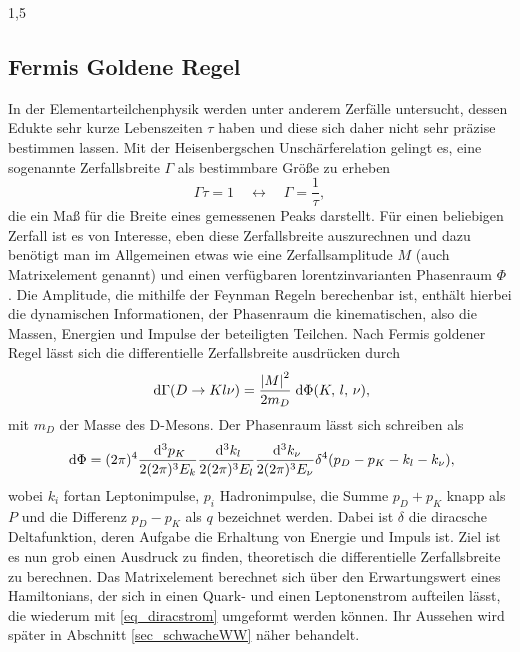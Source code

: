 \documentclass[11pt,a4paper,twoside]{report}
\begin{document}
\begin{spacing}{1,5}
\subsection{Fermis Goldene Regel}
\label{sec_fermi}
In der Elementarteilchenphysik werden unter anderem Zerfälle untersucht, dessen Edukte sehr kurze Lebenszeiten $\tau$ haben und diese sich daher nicht sehr präzise
bestimmen lassen. Mit der Heisenbergschen Unschärferelation gelingt es, eine sogenannte Zerfallsbreite $\Gamma$ als bestimmbare Größe zu erheben
\begin{equation}
 \Gamma \tau = 1 \quad \leftrightarrow\quad  \Gamma = \frac{1}{\tau},
\end{equation} 
die ein Maß für die Breite eines gemessenen Peaks darstellt. Für einen beliebigen Zerfall ist es von Interesse, eben diese Zerfallsbreite auszurechnen und dazu
benötigt man im Allgemeinen etwas wie eine Zerfallsamplitude $M$ (auch Matrixelement genannt) und einen verfügbaren lorentzinvarianten Phasenraum $\Phi$ 
\cite{Griffiths}\cite{TeilFortgeschr}. Die Amplitude,
die mithilfe der Feynman Regeln berechenbar ist, enthält hierbei die dynamischen Informationen, der Phasenraum die kinematischen, also die Massen, Energien
und Impulse der beteiligten Teilchen. Nach Fermis goldener Regel lässt sich die differentielle Zerfallsbreite ausdrücken durch
\begin{equation}
 \; \mathrm{d} \Gamma(D \rightarrow K l \nu) = \frac{\left|M\right|^2}{2m_D}\; \mathrm{d} \Phi(K, \,l,\, \nu),
 \label{eq_fermirule}
\end{equation}
mit $m_D$ der Masse des D-Mesons. Der Phasenraum lässt sich schreiben als
\begin{equation}
 \; \mathrm{d} \Phi = (2\pi)^4 \frac{\; \mathrm{d}^3p_K}{2(2\pi)^3E_k}\frac{\; \mathrm{d}^3k_l}{2(2\pi)^3E_l}\frac{\; \mathrm{d}^3k_\nu}{2(2\pi)^3E_\nu}\delta^4(p_D-p_K-k_l-k_\nu),
\end{equation}
wobei $k_i$ fortan Leptonimpulse, $p_i$ Hadronimpulse, die Summe $p_D+p_K$ knapp als $P$ und die Differenz $p_D - p_K$ als $q$ bezeichnet werden. 
Dabei ist $\delta$ die diracsche Deltafunktion, deren Aufgabe die Erhaltung von Energie und Impuls ist. Ziel ist es nun grob einen Ausdruck zu finden,
theoretisch die differentielle Zerfallsbreite zu berechnen. Das Matrixelement berechnet sich über den Erwartungswert eines Hamiltonians,
der sich in einen Quark- und einen Leptonenstrom aufteilen lässt, die wiederum mit \eqref{eq_diracstrom} umgeformt werden können. 
Ihr Aussehen wird später in Abschnitt \ref{sec_schwacheWW} näher behandelt. 
\begin{align}

\end{align}
\end{spacing}
\end{document}
